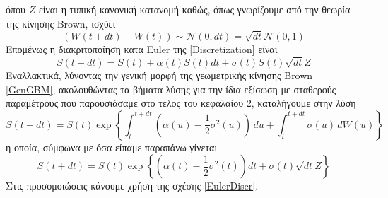 \documentclass[12pt,a4paper,twoside,openany]{book}
\begin{document}
 	όπου $Z$ είναι η τυπική κανονική κατανομή καθώς, όπως γνωρίζουμε από την θεωρία της κίνησης Brown, ισχύει \[\left(W(t+dt)-W(t)\right)\sim\mathcal{N}(0,dt)=\sqrt{dt}\mathcal{N}(0,1)\]
 	Επομένως η διακριτοποίηση κατα Euler της \eqref{Discretization} είναι
 	\[S(t+dt)= S(t) + \alpha(t) S(t)dt + \sigma(t) S(t)\sqrt{dt}Z \]
 	Εναλλακτικά, λύνοντας την γενική μορφή της γεωμετρικής κίνησης Brown \eqref{GenGBM}, ακολουθώντας τα βήματα λύσης για την ίδια εξίσωση με σταθερούς παραμέτρους που παρουσιάσαμε στο τέλος του κεφαλαίου 2, καταλήγουμε στην λύση 
 	\[S(t+dt)= S(t)\exp\left\{ \int_{t}^{t+dt}\left(\alpha(u)-\frac{1}{2}\sigma^2(u)\right)\, du + \int_{t}^{t+dt}\sigma(u)\, dW(u)\right\} \]
 	η οποία, σύμφωνα με όσα είπαμε παραπάνω γίνεται
 	\[S(t+dt)= S(t)\exp\left\{ \left(\alpha(t)-\frac{1}{2}\sigma^2(t)\right) dt + \sigma(t) \sqrt{dt}Z\right\} \label{EulerDiscr}\tag{4.1.3}\]
 	Στις προσομοιώσεις κάνουμε χρήση της σχέσης \eqref{EulerDiscr}.

	
 
\end{document}
